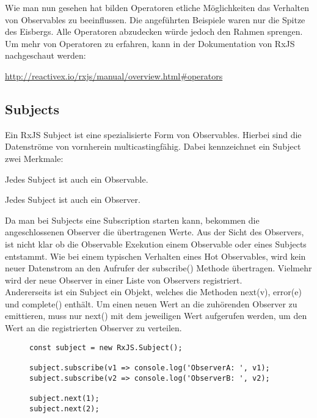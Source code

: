 \noindent
Wie man nun gesehen hat bilden Operatoren etliche Möglichkeiten das Verhalten von Observables zu beeinflussen. Die angeführten Beispiele waren nur die Spitze des Eisbergs. Alle Operatoren abzudecken würde jedoch den Rahmen sprengen. Um mehr von Operatoren zu erfahren, kann in der Dokumentation von RxJS nachgeschaut werden:

\begin{center}
\url{http://reactivex.io/rxjs/manual/overview.html#operators} 
\end{center}









\subsection{Subjects}

Ein RxJS Subject ist eine spezialisierte Form von Observables. Hierbei sind die Datenströme von vornherein multicastingfähig. Dabei kennzeichnet ein Subject zwei Merkmale:

\begin{description}
\item Jedes Subject ist auch ein Observable.
\item Jedes Subject ist auch ein Observer.
\end{description}

\noindent
Da man bei Subjects eine Subscription starten kann, bekommen die angeschlossenen Observer die übertragenen Werte. Aus der Sicht des Observers, ist nicht klar ob die Observable Exekution einem Observable oder eines Subjects entstammt. Wie bei einem typischen Verhalten eines Hot Observables, wird kein neuer Datenstrom an den Aufrufer der subscribe() Methode übertragen. Vielmehr wird der neue Observer in einer Liste von Observers registriert.\\

\noindent
Andererseits ist ein Subject ein Objekt, welches die Methoden next(v), error(e) und complete() enthält. Um einen neuen Wert an die zuhörenden Observer zu emittieren, muss nur next() mit dem jeweiligen Wert aufgerufen werden, um den Wert an die registrierten Observer zu verteilen.

\begin{figure}[H]
\begin{lstlisting}[basicstyle=\small]
const subject = new RxJS.Subject();

subject.subscribe(v1 => console.log('ObserverA: ', v1);
subject.subscribe(v2 => console.log('ObserverB: ', v2);

subject.next(1);
subject.next(2);
\end{lstlisting}
\end{figure}

